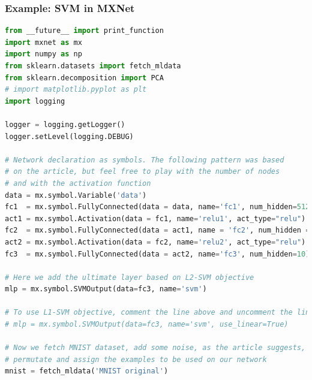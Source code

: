 \begin{frame}[fragile]
  \MyLogo
  \frametitle{Example: SVM in MXNet}  

\begin{lstlisting}[language=python]
from __future__ import print_function
import mxnet as mx
import numpy as np
from sklearn.datasets import fetch_mldata
from sklearn.decomposition import PCA
# import matplotlib.pyplot as plt
import logging

logger = logging.getLogger()
logger.setLevel(logging.DEBUG)

# Network declaration as symbols. The following pattern was based
# on the article, but feel free to play with the number of nodes
# and with the activation function
data = mx.symbol.Variable('data')
fc1  = mx.symbol.FullyConnected(data = data, name='fc1', num_hidden=512)
act1 = mx.symbol.Activation(data = fc1, name='relu1', act_type="relu")
fc2  = mx.symbol.FullyConnected(data = act1, name = 'fc2', num_hidden = 512)
act2 = mx.symbol.Activation(data = fc2, name='relu2', act_type="relu")
fc3  = mx.symbol.FullyConnected(data = act2, name='fc3', num_hidden=10)

# Here we add the ultimate layer based on L2-SVM objective
mlp = mx.symbol.SVMOutput(data=fc3, name='svm')

# To use L1-SVM objective, comment the line above and uncomment the line below
# mlp = mx.symbol.SVMOutput(data=fc3, name='svm', use_linear=True)

# Now we fetch MNIST dataset, add some noise, as the article suggests,
# permutate and assign the examples to be used on our network
mnist = fetch_mldata('MNIST original')
\end{lstlisting}

\end{frame}

